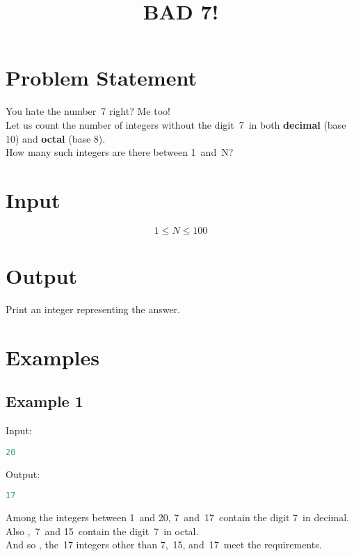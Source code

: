 \documentclass[10pt]{article}
\begin{document}
\title{BAD 7!}
 \date{}
\maketitle
\section{Problem Statement}
You hate the number 7 right? Me too!\\
Let us count the number of integers without the digit 7 in both \textbf{decimal} (base 10) and \textbf{octal} (base 8).\\
How many such integers are there between 1 and N?
\section{Input}
$$ 1\le N \le 100 $$
\section{Output}
Print an integer representing the answer.
\section{Examples}
\subsection{Example 1}
Input:
\begin{lstlisting}[language=Python]
20
\end{lstlisting}
Output:
\begin{lstlisting}[language=Python]
17
\end{lstlisting}
Among the integers between 1 and 20, 7 and 17 contain the digit 7 in decimal. Also , 7 and 15 contain the digit 7 in octal.\\
And so , the 17 integers other than 7, 15, and 17 meet the requirements.
\end{document}
